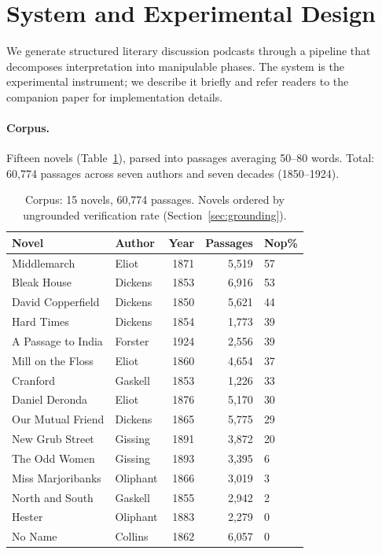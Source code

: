 \documentclass[final]{clv2025}
\begin{document}
\section{System and Experimental Design}
\label{sec:system}

We generate structured literary discussion podcasts through a pipeline
that decomposes interpretation into manipulable phases.  The system is
the experimental instrument; we describe it briefly and refer readers to
the companion paper for implementation details.

\paragraph{Corpus.}  Fifteen novels (Table~\ref{tab:novels}), parsed
into passages averaging 50--80 words.  Total: 60,774 passages across
seven authors and seven decades (1850--1924).

\begin{table}[t]
\centering
\small
\caption{Corpus: 15 novels, 60,774 passages.  Novels ordered by
ungrounded verification rate (Section~\ref{sec:grounding}).}
\label{tab:novels}
\begin{tabular}{llrrl}
\toprule
Novel & Author & Year & Passages & Nop\% \\
\midrule
Middlemarch & Eliot & 1871 & 5,519 & 57 \\
Bleak House & Dickens & 1853 & 6,916 & 53 \\
David Copperfield & Dickens & 1850 & 5,621 & 44 \\
Hard Times & Dickens & 1854 & 1,773 & 39 \\
A Passage to India & Forster & 1924 & 2,556 & 39 \\
Mill on the Floss & Eliot & 1860 & 4,654 & 37 \\
Cranford & Gaskell & 1853 & 1,226 & 33 \\
Daniel Deronda & Eliot & 1876 & 5,170 & 30 \\
Our Mutual Friend & Dickens & 1865 & 5,775 & 29 \\
New Grub Street & Gissing & 1891 & 3,872 & 20 \\
The Odd Women & Gissing & 1893 & 3,395 & 6 \\
Miss Marjoribanks & Oliphant & 1866 & 3,019 & 3 \\
North and South & Gaskell & 1855 & 2,942 & 2 \\
Hester & Oliphant & 1883 & 2,279 & 0 \\
No Name & Collins & 1862 & 6,057 & 0 \\
\bottomrule
\end{tabular}
\end{table}
\end{document}
